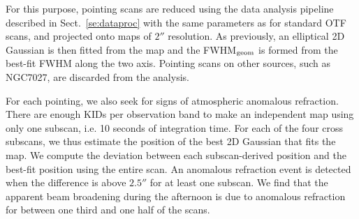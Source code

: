 For this purpose, pointing scans are reduced using
the data analysis pipeline described in
Sect.~\ref{se:dataproc} with the same parameters as for
standard OTF scans, and projected onto maps of $2''$ resolution.
As previously, an elliptical 2D Gaussian is then fitted from the map
and the FWHM$_{\rm{geom}}$ is formed from the best-fit FWHM along the
two axis.
Pointing scans on other sources, such as NGC7027, are discarded from the analysis.

For each pointing, we also seek for signs of atmospheric anomalous refraction. There are
enough KIDs per observation band to make an independent map using only
one subscan, i.e. 10 seconds of integration time.
For each of the four cross subscans, we thus estimate the position of the best
2D Gaussian that fits the map. We compute the deviation between each
subscan-derived position and the best-fit position using the entire
scan. An anomalous refraction event is detected when the difference is
above $2.5''$ for at least one subscan. We find that the apparent beam
broadening during the afternoon is due to anomalous refraction for
between one third and one half of the scans.%

